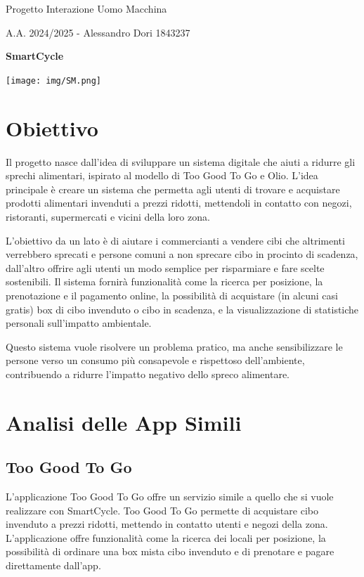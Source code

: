 \documentclass{article}
\begin{document}
\begin{center}
    \Huge Progetto Interazione Uomo Macchina
        \vspace{0.5cm}

        \large A.A. 2024/2025 - Alessandro Dori 1843237
        \vspace{1cm}

        \large \textsf{\textbf{SmartCycle}}

        \texttt{[image: img/SM.png]}
\end{center}

\section{Obiettivo}
Il progetto nasce dall'idea di sviluppare un sistema digitale che aiuti a ridurre gli sprechi alimentari, ispirato al modello di Too Good To Go e Olio. 
L’idea principale è creare un sistema che permetta agli utenti di trovare e acquistare prodotti alimentari invenduti a prezzi ridotti, mettendoli in contatto con negozi, ristoranti, supermercati e vicini della loro zona.

L’obiettivo da un lato è di aiutare i commercianti a vendere cibi che altrimenti verrebbero sprecati e persone comuni a non sprecare cibo in procinto di scadenza, dall’altro offrire agli utenti un modo semplice per risparmiare e fare scelte sostenibili. 
Il sistema fornirà funzionalità come la ricerca per posizione, la prenotazione e il pagamento online, la possibilità di acquistare (in alcuni casi gratis) box di cibo invenduto o cibo in scadenza, e la visualizzazione di statistiche personali sull’impatto ambientale.

Questo sistema vuole risolvere un problema pratico, ma anche sensibilizzare le persone verso un consumo più consapevole e rispettoso dell’ambiente, contribuendo a ridurre l’impatto negativo dello spreco alimentare.

\section{Analisi delle App Simili}
\subsection{Too Good To Go}
L'applicazione Too Good To Go offre un servizio simile a quello che si vuole realizzare con SmartCycle.
Too Good To Go permette di acquistare cibo invenduto a prezzi ridotti, mettendo in contatto utenti e negozi della zona.
L'applicazione offre funzionalità come la ricerca dei locali per posizione, la possibilità di ordinare una box mista cibo invenduto e di prenotare e pagare direttamente dall'app.
\end{document}
